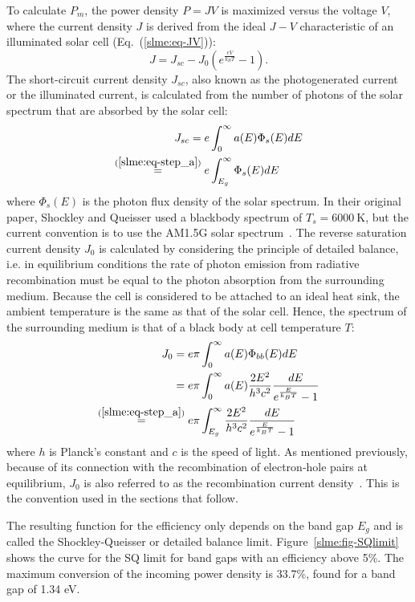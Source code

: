 \begin{refsection}
To calculate $P_m$, the power density $P = JV$ is maximized versus the voltage 
$V$, where the current density $J$ is derived from the ideal $J-V$ 
characteristic of an illuminated solar cell (Eq.~(\ref{slme:eq-JV})): 
\begin{equation}\label{slme:eq-JV} 
J = J_{sc} - J_0 \left(e^{\frac{eV}{k_B T}} - 1\right). 
\end{equation} 
The short-circuit current density $J_{sc}$, also known as the photogenerated 
current or the illuminated current, is calculated from the number of photons 
of the solar spectrum that are absorbed by the solar cell: 
\begin{align} 
J_{sc} = e &\int_0^{\infty} a(E) \Phi_s (E) dE \\ 
\stackrel{(\ref{slme:eq-step_a})}{=} e &\int_{E_g}^{\infty} \Phi_s (E) dE 
\label{slme:eq-Ish} 
\end{align} 
where $\Phi_s(E)$ is the photon flux density of the solar spectrum. In their 
original paper, Shockley and Queisser used a blackbody spectrum of $T_s = 
6000~\si{\kelvin}$, but the current convention is to use the \gls{AM}1.5G solar 
spectrum~\cite{International2012}.  The reverse saturation current density 
$J_0$ is calculated by considering the principle of detailed balance, i.e. in 
equilibrium conditions the rate of photon emission from radiative 
recombination must be equal to the photon absorption from the surrounding 
medium. Because the cell is considered to be attached to an ideal heat sink, 
the ambient temperature is the same as that of the solar cell. Hence, the 
spectrum of the surrounding medium is that of a black body at cell temperature 
$T$: 
\begin{align} 
J_0 = e \pi &\int_0^{\infty} a(E) \Phi_{bb}(E) dE\nonumber \\ 
= e \pi &\int_0^{\infty} a(E) \frac{2E^2}{h^3 c^2} \frac{dE}{e^{\frac{E}{k_B 
T}}-1} \\ 
\stackrel{(\ref{slme:eq-step_a})}{=} e \pi &\int_{E_g}^{\infty} 
\frac{2E^2}{h^3 c^2} \frac{dE}{e^{\frac{E}{k_B T}}-1} \label{slme:eq-I0} 
\end{align} 
where $h$ is Planck's constant and $c$ is the speed of light. As mentioned previously, because of its 
connection with the recombination of electron-hole pairs at equilibrium, $J_0$ 
is also referred to as the recombination current density~\cite{Cuevas2014}. 
This is the convention used in the sections that follow. 
 
The resulting function for the efficiency only depends on the band gap $E_g$ 
and is called the Shockley-Queisser or detailed balance limit. 
Figure~\ref{slme:fig-SQlimit} shows the curve for the \gls{SQ} limit for band gaps 
with an efficiency above 5\%. The maximum conversion of the incoming power 
density is 33.7\%, found for a band gap of 1.34 eV. 
 

\end{refsection}
